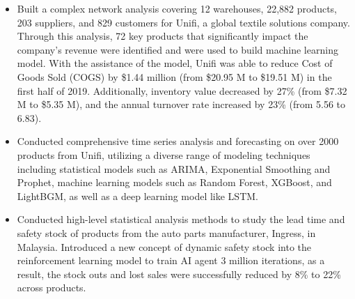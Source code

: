 \documentclass[margin, 10pt]{res} %
\begin{document}
\begin{resume}
\begin{itemize}
    \item Built a complex network analysis covering 12 warehouses, 22,882 products, 203 suppliers, and 829 customers for Unifi, a global textile solutions company. Through this analysis, 72 key products that significantly impact the company's revenue were identified and were used to build machine learning model. With the assistance of the model, Unifi was able to reduce Cost of Goods Sold (COGS) by \$1.44 million (from \$20.95 M to \$19.51 M) in the first half of 2019. Additionally, inventory value decreased by 27\% (from \$7.32 M to \$5.35 M), and the annual turnover rate increased by 23\% (from 5.56 to 6.83).
    \item Conducted comprehensive time series analysis and forecasting on over 2000 products from Unifi, utilizing a diverse range of modeling techniques including statistical models such as ARIMA, Exponential Smoothing and Prophet, machine learning models such as Random Forest, XGBoost, and LightBGM, as well as a deep learning model like LSTM. 
    \item Conducted high-level statistical analysis methods to study the lead time and safety stock of products from the auto parts manufacturer, Ingress, in Malaysia. Introduced a new concept of dynamic safety stock into the reinforcement learning model to train AI agent 3 million iterations, as a result, the stock outs and lost sales were successfully reduced by 8\% to 22\% across products.

\end{itemize}
\end{resume}
\end{document}
